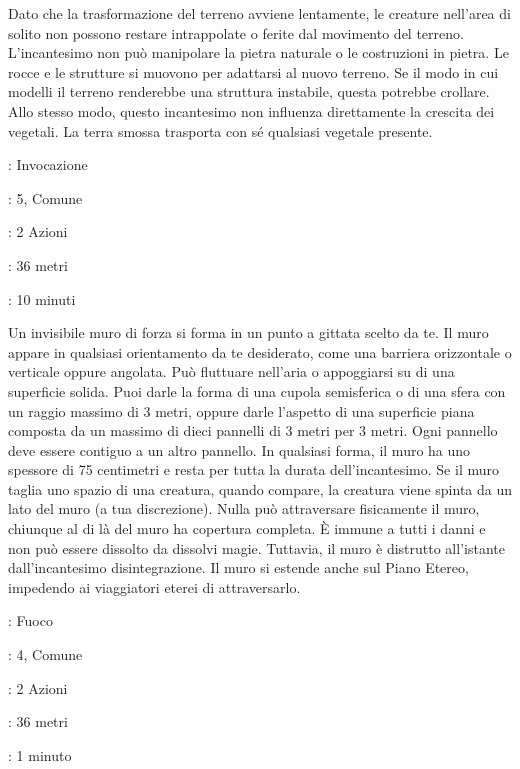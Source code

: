 \begin{multicols}{2}
Dato che la trasformazione del terreno avviene lentamente, le creature nell'area di solito non possono restare intrappolate o ferite dal movimento del terreno. L'incantesimo non può manipolare la pietra naturale o le costruzioni in pietra. Le rocce e le strutture si muovono per adattarsi al nuovo terreno. Se il modo in cui modelli il terreno renderebbe una struttura instabile, questa potrebbe crollare. Allo stesso modo, questo incantesimo non influenza direttamente la crescita dei vegetali. La terra smossa trasporta con sé qualsiasi vegetale presente.

\noindent\colorbox{OBSSgold!10}{
\begin{minipage}{0.95\linewidth}
\begin{description}[noitemsep, topsep=0pt, parsep=0pt, partopsep=0pt, leftmargin=0cm, labelwidth=1.3cm]
	\item[\textbf{Lista}]: Invocazione
	\item[\textbf{Livello}]: 5, Comune
	\item[\textbf{Lancio}]: 2 Azioni
	\item[\textbf{Gittata}]: 36 metri
	\item[\textbf{Durata}]: 10 minuti
\end{description}
\end{minipage}}\smallskip

Un invisibile muro di forza si forma in un punto a gittata scelto da te. Il muro appare in qualsiasi orientamento da te desiderato, come una barriera orizzontale o verticale oppure angolata. Può fluttuare nell'aria o appoggiarsi su di una superficie solida. Puoi darle la forma di una cupola semisferica o di una sfera con un raggio massimo di 3 metri, oppure darle l'aspetto di una superficie piana composta da un massimo di dieci pannelli di 3 metri per 3 metri. Ogni pannello deve essere contiguo a un altro pannello. In qualsiasi forma, il muro ha uno spessore di 75 centimetri e resta per tutta la durata dell'incantesimo. Se il muro taglia uno spazio di una creatura, quando compare, la creatura viene spinta da un lato del muro (a tua discrezione). Nulla può attraversare fisicamente il muro, chiunque al di là del muro ha copertura completa. È immune a tutti i danni e non può essere dissolto da dissolvi magie. Tuttavia, il muro è distrutto all'istante dall'incantesimo disintegrazione. Il muro si estende anche sul Piano Etereo, impedendo ai viaggiatori eterei di attraversarlo.

\noindent\colorbox{OBSSgold!10}{
\begin{minipage}{0.95\linewidth}
\begin{description}[noitemsep, topsep=0pt, parsep=0pt, partopsep=0pt, leftmargin=0cm, labelwidth=1.3cm]
	\item[\textbf{Lista}]: Fuoco
	\item[\textbf{Livello}]: 4, Comune
	\item[\textbf{Lancio}]: 2 Azioni
	\item[\textbf{Gittata}]: 36 metri
	\item[\textbf{Durata}]: 1 minuto
\end{description}
\end{minipage}}\smallskip


\end{multicols}
